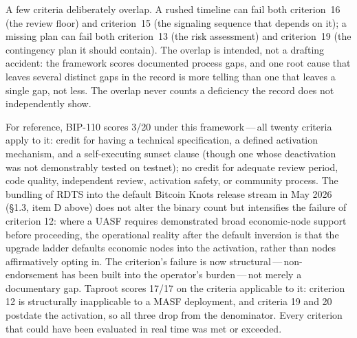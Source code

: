 \documentclass[11pt, twoside, openright]{book}
\newcommand{\sect}[1]{\S#1}
\begin{document}
A few criteria deliberately overlap. A rushed timeline can fail both criterion~16 (the review floor) and criterion~15 (the signaling sequence that depends on it); a missing plan can fail both criterion~13 (the risk assessment) and criterion~19 (the contingency plan it should contain). The overlap is intended, not a drafting accident: the framework scores documented process gaps, and one root cause that leaves several distinct gaps in the record is more telling than one that leaves a single gap, not less. The overlap never counts a deficiency the record does not independently show.

For reference, BIP-110 scores 3/20 under this framework\,---\,all twenty criteria apply to it: credit for having a technical specification, a defined activation mechanism, and a self-executing sunset clause (though one whose deactivation was not demonstrably tested on testnet); no credit for adequate review period, code quality, independent review, activation safety, or community process. The bundling of RDTS into the default Bitcoin Knots release stream in May 2026 (\sect{1.3}, item D above) does not alter the binary count but intensifies the failure of criterion 12: where a UASF requires demonstrated broad economic-node support before proceeding, the operational reality after the default inversion is that the upgrade ladder defaults economic nodes into the activation, rather than nodes affirmatively opting in. The criterion's failure is now structural\,---\,non-endorsement has been built into the operator's burden\,---\,not merely a documentary gap. Taproot scores 17/17 on the criteria applicable to it: criterion 12 is structurally inapplicable to a MASF deployment, and criteria 19 and 20 postdate the activation, so all three drop from the denominator. Every criterion that could have been evaluated in real time was met or exceeded.
\end{document}
